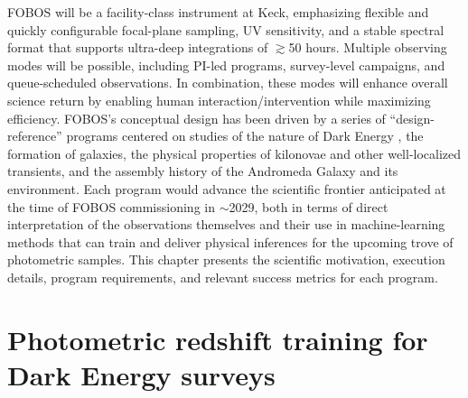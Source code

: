 \documentclass[11pt,a4paper,twoside,onecolumn,openany,final,oldfontcommands]{memoir}
\begin{document}
FOBOS will be a facility-class instrument at Keck, emphasizing flexible and quickly configurable focal-plane sampling, UV sensitivity, and a stable spectral format that supports ultra-deep integrations of $\gtrsim$50 hours.  Multiple observing modes will be possible, including PI-led programs, survey-level campaigns, and queue-scheduled observations.  In combination, these modes will enhance overall science return by enabling human interaction/intervention while maximizing efficiency.  FOBOS's conceptual design has been driven by a series of ``design-reference'' programs centered on studies of the nature of Dark Energy , the formation of galaxies, the physical properties of kilonovae and other well-localized transients, and the assembly history of the Andromeda Galaxy and its environment.  Each program would advance the scientific frontier anticipated at the time of FOBOS commissioning in $\sim$2029, both in terms of direct interpretation of the observations themselves and their use in machine-learning methods that can train and deliver physical inferences for the upcoming trove of photometric samples.  This chapter presents the scientific motivation, execution details, program requirements, and relevant success metrics for each program.


\section{Photometric redshift training for Dark Energy surveys}
\label{sec:photozs}
\end{document}
